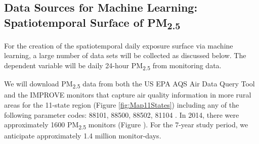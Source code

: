 \documentclass[authoryear]{elsarticle}
\begin{document}
\subsection{Data Sources for Machine Learning: Spatiotemporal Surface of \texorpdfstring{PM\textsubscript{2.5}}{}} \label{MLdataSources}



For the creation of the spatiotemporal daily exposure surface via machine learning, a large number of data sets will be collected as discussed below. The dependent variable will be daily 24-hour PM\textsubscript{2.5} from monitoring data.  

We will download PM\textsubscript{2.5} data from both the US EPA AQS Air Data Query Tool 
\citep{EPAAirData2017} and the IMPROVE monitors that capture air quality information in 
more rural areas \citep{EPANPM25IMPROVE2017} for the 11-state region (Figure \ref{fig:Map11States}) including any of the following parameter codes: 88101, 88500, 88502, 81104 \citep{EPANPM25Memo2017,EPANPM25Parameters2017,EPANAllParameters2017}. In 2014, there were approximately 1600 PM\textsubscript{2.5} monitors (Figure %
). For the 7-year study period, we anticipate approximately 1.4 million monitor-days. 
\end{document}
